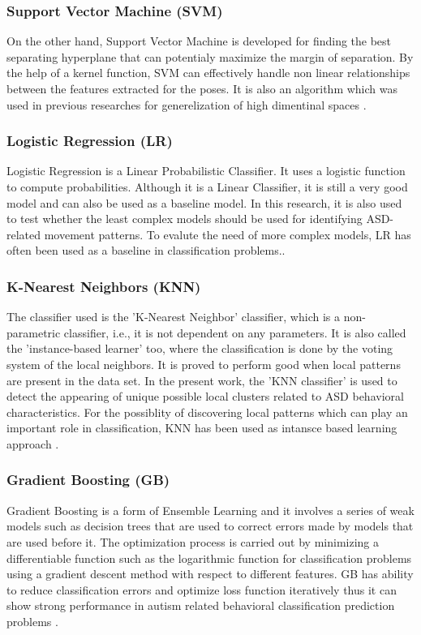 \subsubsection{Support Vector Machine (SVM)}
On the other hand, Support Vector Machine is developed for finding the best separating hyperplane that can potentialy maximize the margin of separation. By the help of a kernel function, SVM can effectively handle non linear relationships between the features extracted for the poses. It is also an algorithm which was used in previous researches for generelization of high dimentinal spaces \cite{duda2016use}.
\subsubsection{Logistic Regression (LR)}
Logistic Regression is a Linear Probabilistic Classifier. It uses a logistic function to compute probabilities. Although it is a Linear Classifier, it is still a very good model and can also be used as a baseline model. In this research, it is also used to test whether the least complex models should be used for identifying ASD-related movement patterns. To evalute the need of more complex models, LR has often been used as a baseline in classification problems.\cite{thabtah2018machine}.

\subsubsection{K-Nearest Neighbors (KNN)}
The classifier used is the 'K-Nearest Neighbor' classifier, which is a non-parametric classifier, i.e., it is not dependent on any parameters. It is also called the 'instance-based learner' too, where the classification is done by the voting system of the local neighbors. It is proved to perform good when local patterns are present in the data set. In the present work, the 'KNN classifier' is used to detect the appearing of unique possible local clusters related to ASD behavioral characteristics. For the possiblity of discovering local patterns which can play an important role in classification, KNN has been used as intansce based learning approach \cite{duda2016use}.

\subsubsection{Gradient Boosting (GB)}
Gradient Boosting is a form of Ensemble Learning and it involves a series of weak models such as decision trees that are used to correct errors made by models that are used before it. The optimization process is carried out by minimizing a differentiable function such as the logarithmic function for classification problems using a gradient descent method with respect to different features. GB has ability to reduce classification errors and optimize loss function iteratively thus it can show strong performance in autism related behavioral classification prediction problems \cite{hossain2023smart}.

